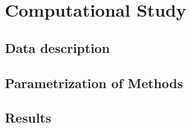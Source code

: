\chapter{Computational Study}

\section{Data description}

\section{Parametrization of Methods}

\section{Results}







